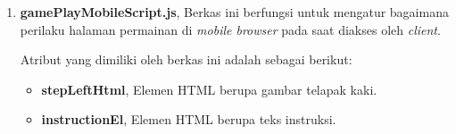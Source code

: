 \begin{enumerate}
\begin{enumerate}
\begin{enumerate}
%				
%				
			
			\item \textbf{gamePlayMobileScript.js}, Berkas ini berfungsi untuk mengatur bagaimana perilaku halaman permainan di \textit{mobile browser} pada saat diakses oleh \textit{client}.
			
			Atribut yang dimiliki oleh berkas ini adalah sebagai berikut:
			\begin{itemize}
				\item \textbf{stepLeftHtml}, Elemen HTML berupa gambar telapak kaki.
				\item \textbf{instructionEl}, Elemen HTML berupa teks instruksi.
			\end{itemize}
			

\end{enumerate}
\end{enumerate}
\end{enumerate}
